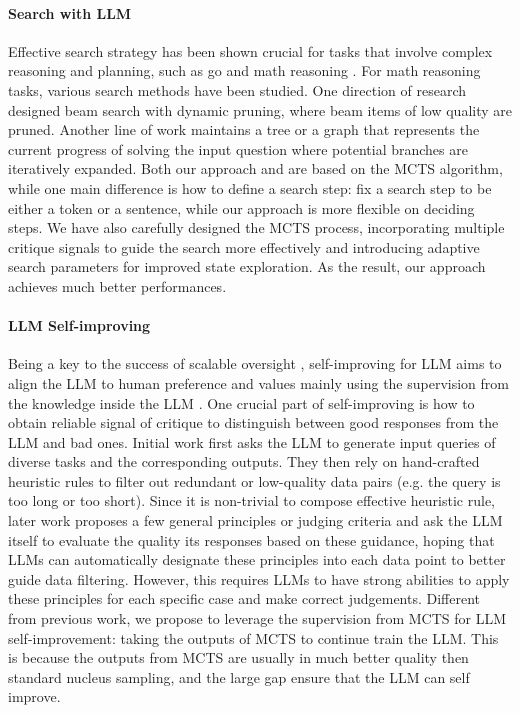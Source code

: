
\paragraph{Search with LLM}
Effective search strategy has been shown crucial for tasks that involve complex reasoning and planning, such as go \citep{silver2016mastering} and math reasoning \citep{gsm8k,math}.
For math reasoning tasks, various search methods have been studied.
One direction of research \citep{zhu2024deductive,xie2024self} designed beam search with dynamic pruning, where beam items of low quality are pruned.
Another line of work \citep{yao2024tree,long2023large,besta2024graph,hao2023reasoning,feng2023alphazero} maintains a tree or a graph that represents the current progress of solving the input question where potential branches are iteratively expanded.
Both our approach and \cite{feng2023alphazero} are based on the MCTS algorithm, while one main difference is how to define a search step: \cite{feng2023alphazero} fix a search step to be either a token or a sentence, while our approach is more flexible on deciding steps.
We have also carefully designed the MCTS process, incorporating multiple critique signals to guide the search more effectively and introducing adaptive search parameters for improved state exploration.
As the result, our approach achieves much better performances.

\paragraph{LLM Self-improving}
Being a key to the success of scalable oversight \citep{bowman2022measuring},
self-improving for LLM aims to align the LLM to human preference and values mainly using the supervision from the knowledge inside the LLM \citep{zelikman2022star,zelikman2024quiet}.
One crucial part of self-improving is how to obtain reliable signal of critique to distinguish between good responses from the LLM and bad ones.
Initial work \citep{bai2022constitutional,wang2022self} first asks the LLM to generate input queries of diverse tasks and the corresponding outputs.
They then rely on hand-crafted heuristic rules to filter out redundant or low-quality data pairs (e.g. the query is too long or too short). 
Since it is non-trivial to compose effective heuristic rule, later work \citep{sun2023principle,li2023self,guo2024human} proposes a few general principles or judging criteria and ask the LLM itself to evaluate the quality its responses based on these guidance, hoping that LLMs can automatically designate these principles into each data point to better guide data filtering. However, this requires LLMs to have strong abilities to apply these principles for each specific case and make correct judgements. Different from previous work, we propose to leverage the supervision from MCTS for LLM self-improvement: taking the outputs of MCTS to continue train the LLM. This is because the outputs from MCTS are usually in much better quality then standard nucleus sampling, and the large gap ensure that the LLM can self improve.

